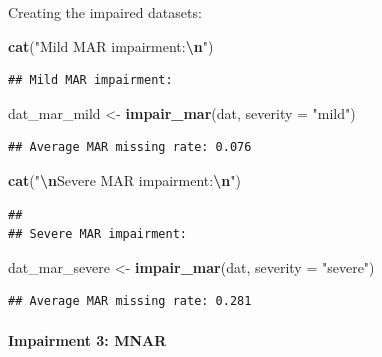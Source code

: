 \documentclass[
]{article}
\newenvironment{Shaded}{\begin{snugshade}}{\end{snugshade}}
\newcommand{\AttributeTok}[1]{\textcolor[rgb]{0.13,0.29,0.53}{#1}}
\newcommand{\FunctionTok}[1]{\textcolor[rgb]{0.13,0.29,0.53}{\textbf{#1}}}
\newcommand{\NormalTok}[1]{#1}
\newcommand{\OtherTok}[1]{\textcolor[rgb]{0.56,0.35,0.01}{#1}}
\newcommand{\SpecialCharTok}[1]{\textcolor[rgb]{0.81,0.36,0.00}{\textbf{#1}}}
\newcommand{\StringTok}[1]{\textcolor[rgb]{0.31,0.60,0.02}{#1}}
\begin{document}
Creating the impaired datasets:

\begin{Shaded}
\begin{Highlighting}[]
\FunctionTok{cat}\NormalTok{(}\StringTok{"Mild MAR impairment:}\SpecialCharTok{\textbackslash{}n}\StringTok{"}\NormalTok{)}
\end{Highlighting}
\end{Shaded}

\begin{verbatim}
## Mild MAR impairment:
\end{verbatim}

\begin{Shaded}
\begin{Highlighting}[]
\NormalTok{dat\_mar\_mild   }\OtherTok{\textless{}{-}} \FunctionTok{impair\_mar}\NormalTok{(dat, }\AttributeTok{severity =} \StringTok{"mild"}\NormalTok{)}
\end{Highlighting}
\end{Shaded}

\begin{verbatim}
## Average MAR missing rate: 0.076
\end{verbatim}

\begin{Shaded}
\begin{Highlighting}[]
\FunctionTok{cat}\NormalTok{(}\StringTok{"}\SpecialCharTok{\textbackslash{}n}\StringTok{Severe MAR impairment:}\SpecialCharTok{\textbackslash{}n}\StringTok{"}\NormalTok{)}
\end{Highlighting}
\end{Shaded}

\begin{verbatim}
## 
## Severe MAR impairment:
\end{verbatim}

\begin{Shaded}
\begin{Highlighting}[]
\NormalTok{dat\_mar\_severe }\OtherTok{\textless{}{-}} \FunctionTok{impair\_mar}\NormalTok{(dat, }\AttributeTok{severity =} \StringTok{"severe"}\NormalTok{)}
\end{Highlighting}
\end{Shaded}

\begin{verbatim}
## Average MAR missing rate: 0.281
\end{verbatim}

\paragraph{\texorpdfstring{\textbf{Impairment 3:
MNAR}}{Impairment 3: MNAR}}\label{impairment-3-mnar}
\end{document}
